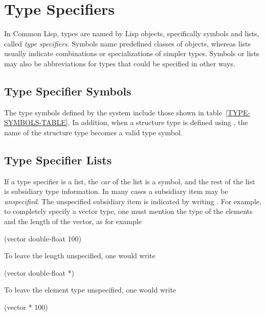 
\clearpage\def\pagestatus{FINAL PROOF}

\ifx \rulang\Undef

\chapter{Type Specifiers}    %
\label{DTSPEC}

In Common Lisp, types are named by Lisp objects, specifically symbols and lists,
called \emph{type specifiers}.  Symbols name predefined classes of objects,
whereas lists usually indicate combinations or
specializations of simpler types.
Symbols or lists may also be abbreviations for types that could
be specified in other ways.

\section{Type Specifier Symbols}

The type symbols defined by the system include those shown in
table~\ref{TYPE-SYMBOLS-TABLE}.
In addition, when a structure type is defined using ,
the name of the structure type becomes a valid type symbol.

\section{Type Specifier Lists}

If a type specifier is a list, the \emph{car}
of the list is a symbol, and the rest of the list is subsidiary
type information.  In many cases a subsidiary item may be
\emph{unspecified}.  The unspecified subsidiary item is indicated
by writing \cd{*}.  For example, to completely specify
a vector type, one must mention the type of the elements
and the length of the vector, as for example
\begin{lisp}
(vector double-float 100)
\end{lisp}
To leave the length unspecified, one would write
\begin{lisp}
(vector double-float *)
\end{lisp}

To leave the element type unspecified, one would write
\begin{lisp}
(vector * 100)
\end{lisp}

